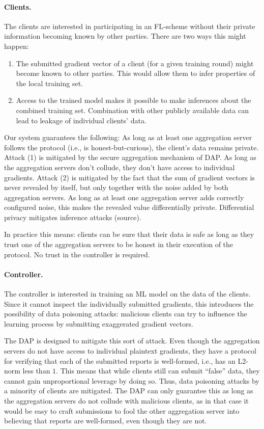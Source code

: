 \documentclass{article}
\begin{document}
\paragraph{Clients.} The clients are interested in participating in an FL-scheme
without their private information becoming known by other parties. There are two
ways this might happen:
\begin{enumerate}[itemsep=0]
\item The submitted gradient vector of a client (for a given training round) might
  become known to other parties. This would allow them to infer properties of
  the local training set.
\item Access to the trained model makes it possible to make inferences about the
  combined training set. Combination with other publicly available data can lead to
  leakage of individual clients' data.
\end{enumerate}
Our system guarantees the following: As long as at least one aggregation server
follows the protocol (i.e., is honest-but-curious), the client's data remains
private. Attack (1) is mitigated by the secure aggregation mechanism of DAP.
As long as the aggregation servers don't collude, they don't have access to
individual gradients. Attack (2) is mitigated by the fact that the sum of
gradient vectors is never revealed by itself, but only together with the noise added by
both aggregation servers. As long as at least one aggregation server adds
correctly configured noise, this makes the revealed value differentially
private. Differential privacy mitigates inference attacks (source).

In practice this means: clients can be sure that their data is safe as long as
they trust one of the aggregation servers to be honest in their execution of the
protocol. No trust in the controller is required.

\paragraph{Controller.} The controller is interested in training an ML model on
the data of the clients. Since it cannot inspect the individually submitted
gradients, this introduces the possibility of data poisoning attacks: malicious
clients can try to influence the learning process by submitting exaggerated
gradient vectors.

The DAP is designed to mitigate this sort of attack. Even though the aggregation
servers do not have access to individual plaintext gradients, they have a
protocol for verifying that each of the submitted reports is well-formed, i.e.,
has an L2-norm less than $1$. This means that while clients still can submit
``false'' data, they cannot gain unproportional leverage by doing so. Thus, data
poisoning attacks by a minority of clients are mitigated. The DAP can only
guarantee this as long as the aggregation servers do not collude with malicious
clients, as in that case it would be easy to craft submissions to fool the other
aggregation server into believing that reports are well-formed, even though they
are not.
\end{document}
